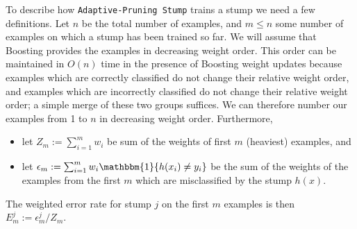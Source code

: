 To describe how \texttt{Adaptive-Pruning Stump} trains a stump
we need a few definitions.
Let $n$ be the total number of examples, and $m \le n$ some number of examples
on which a stump has been trained so far.
We will assume that Boosting provides the examples in decreasing weight
order.
This order can be maintained in $O(n)$ time in the presence of Boosting weight updates
because examples which are correctly classified do not change their relative
weight order, and examples which are incorrectly classified do not change their
relative weight order; a simple merge of these two groups suffices.
We can therefore number our examples from 1 to $n$ in decreasing weight order.
Furthermore,
\begin{itemize}[topsep=0pt,itemsep=0pt]
\item let $Z_m := \sum_{i=1}^m {w_i}$ be sum of the weights of first $m$ (heaviest) examples, and
\item let $\epsilon_m := \sum_{i=1}^m {w_i \mathbbm{1} \{h(x_i) \ne y_i\}}$ be the sum of the weights of the examples from the first $m$ which are misclassified by the stump $h(x)$.
\end{itemize}

The weighted error rate for stump $j$ on the first $m$ examples is then
$E^j_m := \epsilon_m^j / Z_m$.



